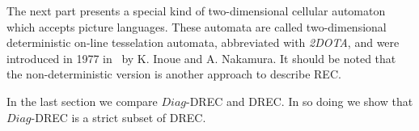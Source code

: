 The next part presents a special kind of two-dimensional cellular automaton which accepts
picture languages. These automata are called two-dimensional deterministic on-line tesselation
automata, abbreviated with \emph{2DOTA}, and were introduced in 1977 in~\cite{inoue1977properties}
by K. Inoue and A. Nakamura. It should be noted that the non-deterministic version is another
approach to describe REC. 

In the last section we compare $Diag$-DREC and DREC. In so doing we show that $Diag$-DREC is a
strict subset of DREC.